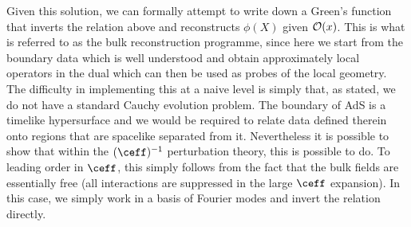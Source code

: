 \documentclass[12pt,openany]{book}
\begin{document}
Given this solution, we can formally attempt to write down a Green's function that inverts the relation above and reconstructs $\phi(X) $ given ${\cal O}(x)$. This is what is referred to as the bulk reconstruction programme, since here we start from the boundary data which is well understood and obtain approximately local operators in the dual which can then be used as probes of the local geometry. The difficulty in implementing this at a naive level is simply that, as stated, we do not have a standard Cauchy evolution problem. The boundary of AdS is a timelike hypersurface and we would be required to relate data defined therein onto regions that are spacelike separated from it. Nevertheless it is possible to show that within the $(\ceff)^{-1}$ perturbation theory, this is possible to do. To leading order in $\ceff$, this simply follows from the fact that the bulk fields are essentially free (all interactions are suppressed in the large $\ceff$ expansion). In this case, we simply work in a basis of Fourier modes and invert the relation directly.
\end{document}
